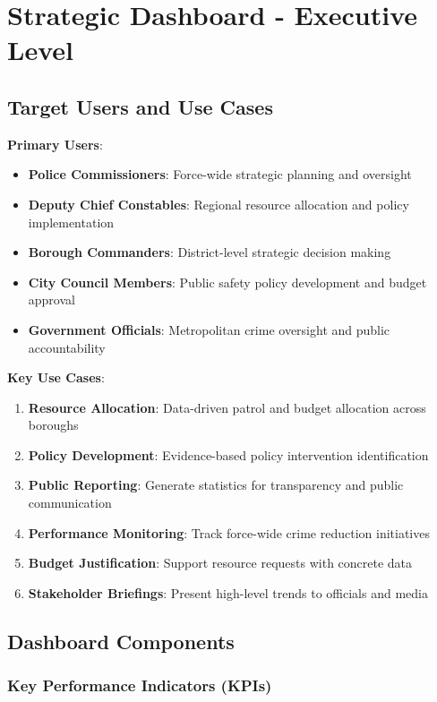 \documentclass[12pt,a4paper]{article}
\begin{document}
\section{Strategic Dashboard - Executive Level}

\subsection{Target Users and Use Cases}

\textbf{Primary Users}:
\begin{itemize}
    \item \textbf{Police Commissioners}: Force-wide strategic planning and oversight
    \item \textbf{Deputy Chief Constables}: Regional resource allocation and policy implementation
    \item \textbf{Borough Commanders}: District-level strategic decision making
    \item \textbf{City Council Members}: Public safety policy development and budget approval
    \item \textbf{Government Officials}: Metropolitan crime oversight and public accountability
\end{itemize}

\textbf{Key Use Cases}:
\begin{enumerate}
    \item \textbf{Resource Allocation}: Data-driven patrol and budget allocation across boroughs
    \item \textbf{Policy Development}: Evidence-based policy intervention identification
    \item \textbf{Public Reporting}: Generate statistics for transparency and public communication
    \item \textbf{Performance Monitoring}: Track force-wide crime reduction initiatives
    \item \textbf{Budget Justification}: Support resource requests with concrete data
    \item \textbf{Stakeholder Briefings}: Present high-level trends to officials and media
\end{enumerate}

\subsection{Dashboard Components}

\subsubsection{Key Performance Indicators (KPIs)}
\end{document}
